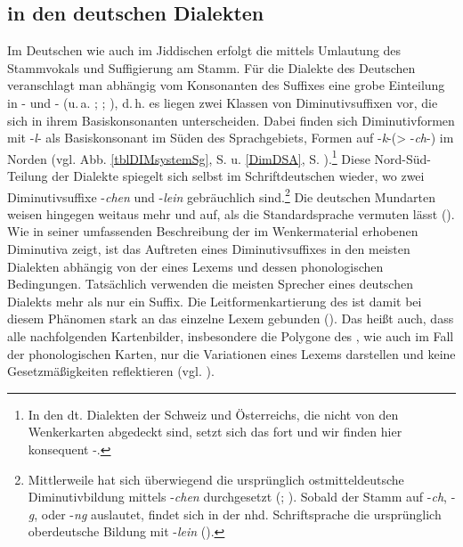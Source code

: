 \subsection{ in den deutschen Dialekten}\label{dimDEUTSCH}
Im Deutschen wie auch im Jiddischen erfolgt die  mittels Umlautung des Stammvokals und Suffigierung am Stamm. Für die Dialekte des Deutschen veranschlagt man abhängig vom Konsonanten des Suffixes eine grobe Einteilung in - und - (u.\,a. \cite{Wrede1908}; \cite[475–487]{Schirmunski1962}; \cite{Seebold1983}), d.\,h. es liegen zwei Klassen von Diminutivsuffixen vor, die sich in ihrem Basiskonsonanten unterscheiden. Dabei finden sich Diminutivformen mit -\textit{l}- als Basiskonsonant im Süden des Sprachgebiets, Formen auf -\textit{k}-(> -\textit{ch}-) im Norden (vgl. Abb. \ref{tblDIMsystemSg}, S. \pageref{tblDIMsystemSg} u. \ref{DimDSA}, S. \pageref{DimDSA}).\footnote{In den dt. Dialekten der Schweiz und Österreichs, die nicht von den Wenkerkarten abgedeckt sind, setzt sich das  fort und wir finden hier konsequent -.} Diese Nord-Süd-Teilung der Dialekte spiegelt sich selbst im Schriftdeutschen wieder, wo zwei Diminutivsuffixe -\textit{chen} und -\textit{lein} gebräuchlich sind.\footnote{Mittlerweile hat sich überwiegend die ursprünglich ostmitteldeutsche Diminutivbildung mittels -\textit{chen} durchgesetzt (\cite[475, 479]{Schirmunski1962}; \cite[157]{Koenig1978}). Sobald der Stamm auf -\textit{ch}, -\textit{g}, oder -\textit{ng} auslautet, findet sich in der nhd. Schriftsprache die ursprünglich oberdeutsche Bildung mit -\textit{lein} (\cite[475]{Schirmunski1962}).} Die deutschen Mundarten weisen hingegen weitaus mehr und  auf, als die Standardsprache vermuten lässt (\cite[476]{Schirmunski1962}). Wie \textcite{Wrede1908} in seiner umfassenden Beschreibung der im Wenkermaterial erhobenen Diminutiva zeigt, ist das Auftreten eines Diminutivsuffixes in den meisten Dialekten abhängig von der  eines Lexems und dessen phonologischen Bedingungen. Tatsächlich verwenden die meisten Sprecher eines deutschen Dialekts mehr als nur ein Suffix. Die Leitformenkartierung des  ist damit bei diesem Phänomen stark an das einzelne Lexem gebunden (\cite[74f]{Wrede1908}).\label{wredeDIM} Das heißt auch, dass alle nachfolgenden Kartenbilder, insbesondere die Polygone des , wie auch im Fall der phonologischen Karten, nur die Variationen eines Lexems darstellen und keine Gesetzmäßigkeiten reflektieren (vgl. \cite[79]{Wrede1908}). 
   
